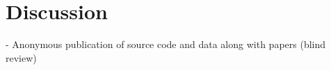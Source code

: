 
\chapter{Discussion}

- Anonymous publication of source code and data along with papers (blind review)

\cleardoublepage
